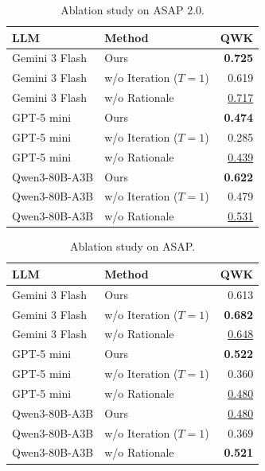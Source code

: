 \begin{table}[t]
\centering
\small
\caption{Ablation study on ASAP 2.0.}
\begin{tabular}{llr}
\toprule
LLM & Method & QWK \\
\midrule
Gemini 3 Flash & Ours & \textbf{0.725} \\
Gemini 3 Flash & w/o Iteration ($T=1$) & 0.619 \\
Gemini 3 Flash & w/o Rationale & \underline{0.717} \\
\midrule
GPT-5 mini & Ours & \textbf{0.474} \\
GPT-5 mini & w/o Iteration ($T=1$) & 0.285 \\
GPT-5 mini & w/o Rationale & \underline{0.439} \\
\midrule
Qwen3-80B-A3B & Ours & \textbf{0.622} \\
Qwen3-80B-A3B & w/o Iteration ($T=1$) & 0.479 \\
Qwen3-80B-A3B & w/o Rationale & \underline{0.531} \\
\bottomrule
\end{tabular}
\end{table}

\begin{table}[t]
\centering
\small
\caption{Ablation study on ASAP.}
\begin{tabular}{llr}
\toprule
LLM & Method & QWK \\
\midrule
Gemini 3 Flash & Ours & 0.613 \\
Gemini 3 Flash & w/o Iteration ($T=1$) & \textbf{0.682} \\
Gemini 3 Flash & w/o Rationale & \underline{0.648} \\
\midrule
GPT-5 mini & Ours & \textbf{0.522} \\
GPT-5 mini & w/o Iteration ($T=1$) & 0.360 \\
GPT-5 mini & w/o Rationale & \underline{0.480} \\
\midrule
Qwen3-80B-A3B & Ours & \underline{0.480} \\
Qwen3-80B-A3B & w/o Iteration ($T=1$) & 0.369 \\
Qwen3-80B-A3B & w/o Rationale & \textbf{0.521} \\
\bottomrule
\end{tabular}
\end{table}

